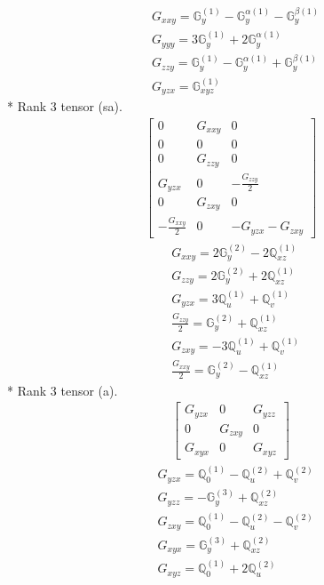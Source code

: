 \documentclass[fleqn,8pt,landscape]{jsarticle}
\begin{document}
\begin{align*}
& G_{xxy} = \mathbb{G}_{y}^{(1)} - \mathbb{G}_{y}^{\alpha(1)} - \mathbb{G}_{y}^{\beta(1)} \\
& G_{yyy} = 3 \mathbb{G}_{y}^{(1)} + 2 \mathbb{G}_{y}^{\alpha(1)} \\
& G_{zzy} = \mathbb{G}_{y}^{(1)} - \mathbb{G}_{y}^{\alpha(1)} + \mathbb{G}_{y}^{\beta(1)} \\
& G_{yzx} = \mathbb{G}_{xyz}^{(1)}
\end{align*}
* Rank 3 tensor (sa).
\begin{align*}
\begin{bmatrix} 0 & G_{xxy} & 0 \\ 0 & 0 & 0 \\ 0 & G_{zzy} & 0 \\ G_{yzx} & 0 & - \frac{G_{zzy}}{2} \\ 0 & G_{zxy} & 0 \\ - \frac{G_{xxy}}{2} & 0 & - G_{yzx} - G_{zxy} \end{bmatrix}
\end{align*}
\begin{align*}
& G_{xxy} = 2 \mathbb{G}_{y}^{(2)} - 2 \mathbb{Q}_{xz}^{(1)} \\
& G_{zzy} = 2 \mathbb{G}_{y}^{(2)} + 2 \mathbb{Q}_{xz}^{(1)} \\
& G_{yzx} = 3 \mathbb{Q}_{u}^{(1)} + \mathbb{Q}_{v}^{(1)} \\
& \frac{G_{zzy}}{2} = \mathbb{G}_{y}^{(2)} + \mathbb{Q}_{xz}^{(1)} \\
& G_{zxy} = - 3 \mathbb{Q}_{u}^{(1)} + \mathbb{Q}_{v}^{(1)} \\
& \frac{G_{xxy}}{2} = \mathbb{G}_{y}^{(2)} - \mathbb{Q}_{xz}^{(1)}
\end{align*}
* Rank 3 tensor (a).
\begin{align*}
\begin{bmatrix} G_{yzx} & 0 & G_{yzz} \\ 0 & G_{zxy} & 0 \\ G_{xyx} & 0 & G_{xyz} \end{bmatrix}
\end{align*}
\begin{align*}
& G_{yzx} = \mathbb{Q}_{0}^{(1)} - \mathbb{Q}_{u}^{(2)} + \mathbb{Q}_{v}^{(2)} \\
& G_{yzz} = - \mathbb{G}_{y}^{(3)} + \mathbb{Q}_{xz}^{(2)} \\
& G_{zxy} = \mathbb{Q}_{0}^{(1)} - \mathbb{Q}_{u}^{(2)} - \mathbb{Q}_{v}^{(2)} \\
& G_{xyx} = \mathbb{G}_{y}^{(3)} + \mathbb{Q}_{xz}^{(2)} \\
& G_{xyz} = \mathbb{Q}_{0}^{(1)} + 2 \mathbb{Q}_{u}^{(2)}
\end{align*}
\end{document}
